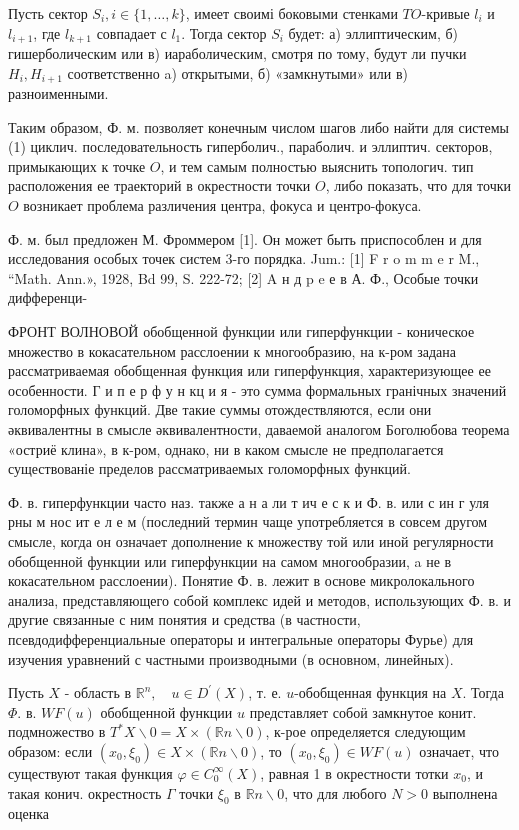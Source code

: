 \documentclass[10pt]{article}
\begin{document}
Пусть сектор $S_{i}, i \in\{1, \ldots, k\}$, имеет своимі боковыми стенками $T O$-кривые $l_{i}$ и $l_{i+1}$, где $l_{k+1}$ совпадает с $l_{1}$. Тогда сектор $S_{i}$ будет: а) эллиптическим, б) гишерболическим или в) иараболическим, смотря по тому, будут ли пучки $H_{i}, H_{i+1}$ соответственно a) открытыми, б) «замкнутыми» или в) разноименными.



Таким образом, Ф. м. позволяет конечным числом шагов либо найти для системы (1) циклич. последовательность гиперболич., параболич. и эллиптич. секторов, примыкающих к точке $O$, и тем самым полностью выяснить топологич. тип расположения ее траекторий в окрестности точки $O$, либо показать, что для точки $O$ возникает проблема различения центра, фокуса и центро-фокуса.



Ф. м. был предложен М. Фроммером [1]. Он может быть приспособлен и для исследования особых точек систем 3-го порядка. Jum.: [1] F r o m m e r M., “Math. Ann.», 1928, Bd 99, S. 222-72; [2] A н д p e е в А. Ф., Особые точки дифференци-



ФРОНТ ВОЛНОВОЙ обобщенной функции или гиперфункции - коническое множество в кокасательном расслоении к многообразию, на к-ром задана рассматриваемая обобщенная функция или гиперфункция, характеризующее ее особенности. Г и п е р ф у н кц и я - это сумма формальных гранічных значений голоморфных функций. Две такие суммы отождествляются, если они әквивалентны в смысле әквивалентности, даваемой аналогом Боголюбова теорема «остриё клина», в к-ром, однако, ни в каком смысле не предполагается существованіе пределов рассматриваемых голоморфных функций.



Ф. в. гиперфункции часто наз. также а н а ли т ич е с к и $Ф$. в. или с ин г уля рны м нос ит е л е м (последний термин чаще употребляется в совсем другом смысле, когда он означает дополнение к множеству той или иной регулярности обобщенной функции или гиперфункции на самом многообразии, a не в кокасательном расслоении). Понятие Ф. в. лежит в основе микролокального анализа, представляющего собой комплекс идей и методов, использующих Ф. в. и другие связанные с ним понятия и средства (в частности, псевдодифференциальные операторы и интегральные операторы Фурье) для изучения уравнений с частными производными (в основном, линейных).



Пусть $X$ - область в $\mathbb{R}^{n}, \quad u \in D^{\prime}(X)$, т. е. $u$-обобщенная функция на $X$. Тогда $\Phi$. в. $W F(u)$ обобщенной функции $u$ представляет собоӥ замкнутое конит. подмножество в $T^{*} X \backslash 0=X \times(\mathbb{R} n \backslash 0)$, к-рое определяется следующим образом: если $\left(x_{0}, \xi_{0}\right) \in X \times(\mathbb{R} n \backslash 0)$, то $\left(x_{0}, \xi_{0}\right) \in W F(u)$ означает, что существуют такая функция $\varphi \in C_{0}^{\infty}(X)$, равная 1 в окрестности тотки $x_{0}$, и такая конич. окрестность $\Gamma$ точки $\xi_{0}$ в $\mathbb{R} n \backslash 0$, что для любого $N>0$ выполнена оценка
\end{document}
